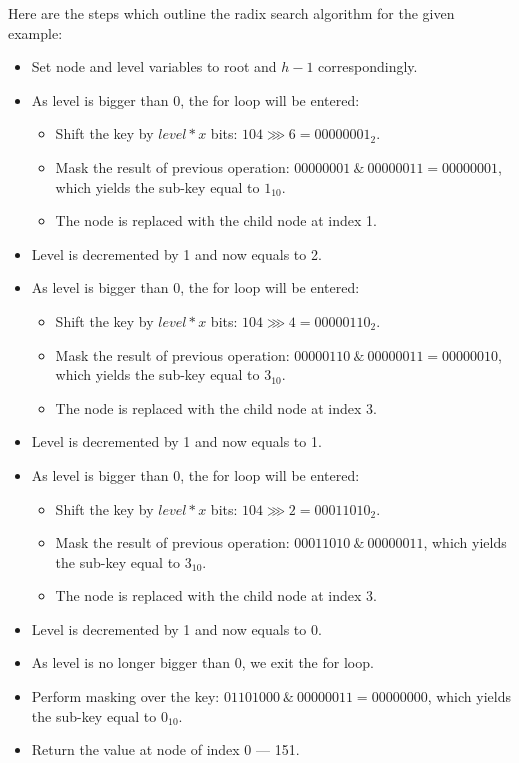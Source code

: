 Here are the steps which outline the radix search algorithm for the given example: 
\begin{itemize}
    \item Set node and level variables to root and $h - 1$ correspondingly.
    \item As level is bigger than 0, the for loop will be entered:
    \begin{itemize}
        \item Shift the key by $level * x$ bits: $104 \ggg 6 = 00000001_2$.
        \item Mask the result of previous operation: $00000001\ \& \ 00000011 = 00000001$, which yields the sub-key equal to $1_{10}$.
        \item The node is replaced with the child node at index 1. 
    \end{itemize}
    \item Level is decremented by 1 and now equals to 2. 
    \item As level is bigger than 0, the for loop will be entered: 
    \begin{itemize}
        \item Shift the key by $level * x$ bits: $104 \ggg 4 = 00000110_2$.
        \item Mask the result of previous operation: $00000110\ \& \ 00000011 = 00000010$, which yields the sub-key equal to $3_{10}$.
        \item The node is replaced with the child node at index 3.
    \end{itemize}
    \item Level is decremented by 1 and now equals to 1. 
    \item As level is bigger than 0, the for loop will be entered: 
    \begin{itemize}
        \item Shift the key by $level * x$ bits: $104 \ggg 2 = 00011010_2$.
        \item Mask the result of previous operation: $00011010\ \& \ 00000011$, which yields the sub-key equal to $3_{10}$.        
        \item The node is replaced with the child node at index 3.
    \end{itemize}
    \item Level is decremented by 1 and now equals to 0. 
    \item As level is no longer bigger than 0, we exit the for loop.
    \item Perform masking over the key: $01101000\ \& \ 00000011 = 00000000$, which yields the sub-key equal to $0_{10}$.
    \item Return the value at node of index 0 --- 151.    
\end{itemize}

